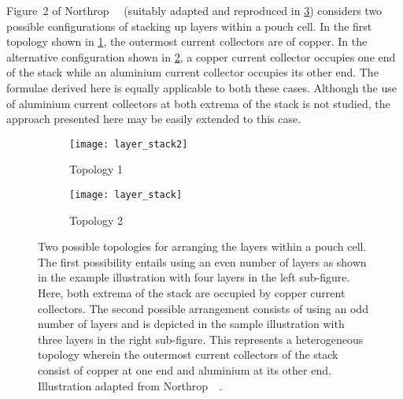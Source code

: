 Figure~2 of Northrop~\etal~\cite{Northrop2011}  (suitably adapted and reproduced
in \cref{fig:topologies})  considers two possible configurations  of stacking up
layers within a pouch cell. In the first topology shown in \cref{fig:topology1},
the outermost current collectors are of copper. In the alternative configuration
shown in  \cref{fig:topology2}, a copper  current collector occupies one  end of
the  stack while  an aluminium  current collector  occupies its  other end.  The
formulae derived  here is equally applicable  to both these cases.  Although the
use of aluminium current collectors at both extrema of the stack is not studied,
the approach presented here may be easily extended to this case.

\begin{figure}[!htbp]
    \centering
    \begin{subfigure}[b]{0.725\textwidth}
        \texttt{[image: layer\_stack2]}
        \caption{Topology 1}
        \label{fig:topology1}
    \end{subfigure}
    \hfill
    \begin{subfigure}[b]{0.225\textwidth}
        \texttt{[image: layer\_stack]}
        \caption{Topology 2}
        \label{fig:topology2}
    \end{subfigure}
    \caption[Two possible topologies for arranging the layers within a pouch
    cell]
    {Two possible topologies for arranging the layers within a pouch cell. The
        first possibility entails using an even number of layers as shown in the
        example illustration with four layers in the left sub-figure. Here, both
        extrema of the stack are occupied by copper current collectors. The
        second possible arrangement consists of using an odd number of layers
        and  is depicted in the  sample illustration with three layers in
        the right sub-figure. This represents a heterogeneous topology wherein
        the outermost current collectors of the stack consist of copper at one
        end and aluminium at its other end. Illustration adapted from
    Northrop~\etal~\cite{Northrop2011}.}
    \label{fig:topologies}
\end{figure}

